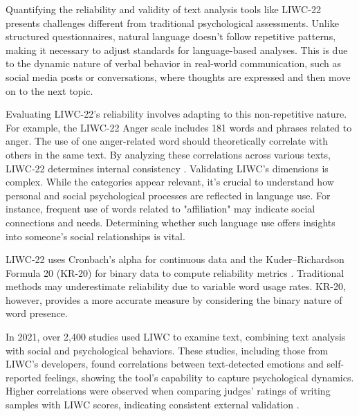 Quantifying the reliability and validity of text analysis tools like LIWC-22 presents challenges different from traditional psychological assessments. Unlike structured questionnaires, natural language doesn't follow repetitive patterns, making it necessary to adjust standards for language-based analyses. This is due to the dynamic nature of verbal behavior in real-world communication, such as social media posts or conversations, where thoughts are expressed and then move on to the next topic.

Evaluating LIWC-22's reliability involves adapting to this non-repetitive nature. For example, the LIWC-22 Anger scale includes 181 words and phrases related to anger. The use of one anger-related word should theoretically correlate with others in the same text. By analyzing these correlations across various texts, LIWC-22 determines internal consistency \cite{boyd2022development}. Validating LIWC's dimensions is complex. While the categories appear relevant, it's crucial to understand how personal and social psychological processes are reflected in language use. For instance, frequent use of words related to "affiliation" may indicate social connections and needs. Determining whether such language use offers insights into someone's social relationships is vital.

LIWC-22 uses Cronbach’s alpha for continuous data and the Kuder–Richardson Formula 20 (KR-20) for binary data to compute reliability metrics \cite{kuder1937theory}. Traditional methods may underestimate reliability due to variable word usage rates. KR-20, however, provides a more accurate measure by considering the binary nature of word presence.

In 2021, over 2,400 studies used LIWC to examine text, combining text analysis with social and psychological behaviors. These studies, including those from LIWC's developers, found correlations between text-detected emotions and self-reported feelings, showing the tool's capability to capture psychological dynamics. Higher correlations were observed when comparing judges' ratings of writing samples with LIWC scores, indicating consistent external validation \cite{boyd2022development}.
